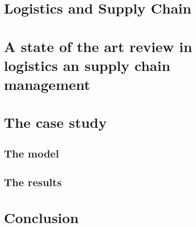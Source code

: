 \documentclass{article}
\begin{document}
\section{Logistics and Supply Chain}

\section{A state of the art review in logistics an supply chain management}

\section{The case study}
\subsection{The model}
\subsection{The results}

\section{Conclusion}
\end{document}
